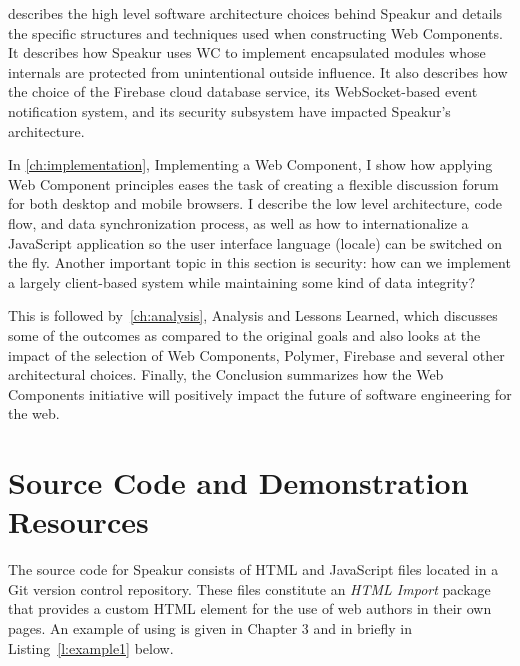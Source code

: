  describes the high level software architecture choices behind Speakur and details the specific structures and techniques used when constructing Web Components.
It describes how Speakur uses WC to implement encapsulated modules whose internals are protected from unintentional outside influence. 
It also describes how the choice of the Firebase cloud database service, its WebSocket-based event notification system, and its security subsystem have impacted Speakur's architecture.

In \cref{ch:implementation}, Implementing a Web Component, I show how applying Web Component principles eases the task of creating a flexible discussion forum for both desktop and mobile browsers. 
I describe the low level architecture, code flow, and data synchronization process, 
as well as how to internationalize a JavaScript application so the user interface language (locale) can be switched on the fly.
Another important topic in this section is security: how can we implement a largely client-based system while maintaining some kind of data integrity?

This is followed by~\cref{ch:analysis}, Analysis and Lessons Learned, which discusses some of the outcomes 
as compared to the original goals and also looks at the impact of the selection of Web Components, 
Polymer, Firebase and several other architectural choices. 
Finally, the Conclusion summarizes how the Web Components initiative will positively impact the future of software engineering for the web. 

\section{Source Code and Demonstration Resources}

The source code for Speakur consists of HTML and JavaScript files located in a Git version control repository. 
These files constitute an \textit{HTML Import} package that provides a
\textbf{}
custom HTML element for the use of web authors in their own pages.
An example of using  is given in Chapter 3 and in briefly in Listing~\ref{l:example1} below.

